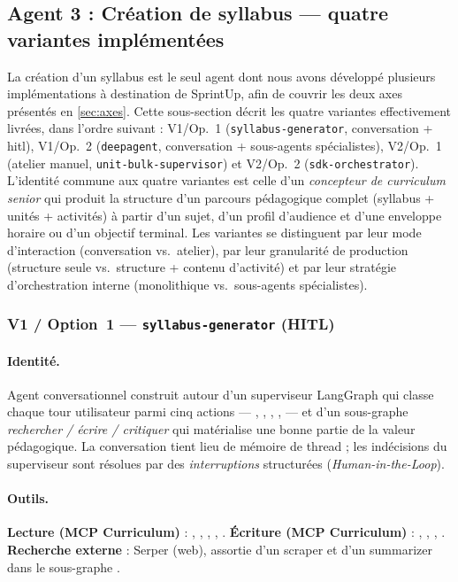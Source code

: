 \subsection{Agent 3 : Création de syllabus — quatre variantes
implémentées}
\label{sec:agent3}

La création d'un syllabus est le seul agent dont nous avons développé
plusieurs implémentations à destination de SprintUp, afin de couvrir
les deux axes présentés en \textsection\ref{sec:axes}. Cette
sous-section décrit les quatre variantes effectivement livrées, dans
l'ordre suivant : V1/Op.~1 (\texttt{syllabus-generator}, conversation +
\gls{hitl}), V1/Op.~2 (\texttt{deepagent}, conversation + sous-agents
spécialistes), V2/Op.~1 (atelier manuel,
\texttt{unit-bulk-supervisor}) et V2/Op.~2
(\texttt{sdk-orchestrator}). L'identité commune aux quatre variantes
est celle d'un \emph{concepteur de curriculum senior} qui produit la
structure d'un parcours pédagogique complet (syllabus + unités +
activités) à partir d'un sujet, d'un profil d'audience et d'une
enveloppe horaire ou d'un objectif terminal. Les variantes se
distinguent par leur mode d'interaction (conversation vs.\ atelier),
par leur granularité de production (structure seule vs.\ structure +
contenu d'activité) et par leur stratégie d'orchestration interne
(monolithique vs.\ sous-agents spécialistes).

\subsubsection{V1 / Option~1 — \texttt{syllabus-generator} (HITL)}
\label{sec:v1-op1}

\paragraph{Identité.} Agent conversationnel construit autour d'un
superviseur LangGraph qui classe chaque tour utilisateur parmi cinq
actions — , , ,
,  — et d'un sous-graphe
\emph{rechercher / écrire / critiquer} qui matérialise une bonne partie
de la valeur pédagogique. La conversation tient lieu de mémoire de
thread ; les indécisions du superviseur sont résolues par des
\emph{interruptions} structurées (\emph{Human-in-the-Loop}).

\paragraph{Outils.} \textbf{Lecture (MCP Curriculum)} :
, ,
, ,
. \textbf{Écriture (MCP Curriculum)} :
, ,
, . \textbf{Recherche
externe} : Serper (web), assortie d'un scraper et d'un summarizer dans
le sous-graphe .

